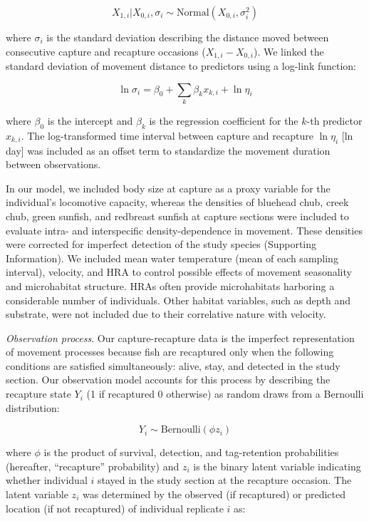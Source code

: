 \documentclass[11pt, class=article, crop=false]{standalone}
\begin{document}
\begin{equation}
    X_{1, i}|X_{0, i}, \sigma_i \sim \text{Normal}(X_{0, i}, \sigma_i^2)
    \label{eq:normal}
\end{equation}

where $\sigma_i$ is the standard deviation describing the distance moved between consecutive capture and recapture occasions ($X_{1,i} - X_{0,i}$).
We linked the standard deviation of  movement distance to predictors using a log-link function: 

\begin{equation}
    \ln \sigma_i = \beta_0 + \sum_{k} \beta_k x_{k,i} + \ln \eta_i
    \label{eq:linear-pred}
\end{equation}

where $\beta_0$ is the intercept and $\beta_k$ is the regression coefficient for the $k$-th predictor $x_{k,i}$. The log-transformed time interval between capture and recapture $\ln \eta_i$ [ln day] was included as an offset term to standardize the movement duration between observations.

In our model, we included body size at capture as a proxy variable for the individual’s locomotive capacity, whereas the densities of bluehead chub, creek chub, green sunfish, and redbreast sunfish at capture sections were included to evaluate intra- and interspecific density-dependence in movement. These densities were corrected for imperfect detection of the study species (Supporting Information). We included mean water temperature (mean of each sampling interval), velocity, and HRA to control possible effects of movement seasonality and microhabitat structure. HRAs often provide microhabitats harboring a considerable number of individuals.  Other habitat variables, such as depth and substrate, were not included due to their correlative nature with velocity. 

\textit{Observation process}. Our capture-recapture data is the imperfect representation of movement processes because fish are recaptured only when the following conditions are satisfied simultaneously: alive, stay, and detected in the study section. Our observation model accounts for this process by describing the recapture state $Y_i$ (1 if recaptured 0 otherwise) as random draws from a Bernoulli distribution:

\begin{equation}
    Y_i \sim \text{Bernoulli}(\phi z_i)
\end{equation}

where $\phi$ is the product of survival, detection, and tag-retention probabilities (hereafter, ``recapture'' probability) and $z_i$ is the binary latent variable indicating whether individual $i$ stayed in the study section at the recapture occasion.
The latent variable $z_i$ was determined by the observed (if recaptured) or predicted location (if not recaptured) of individual replicate $i$ as: 
\end{document}
